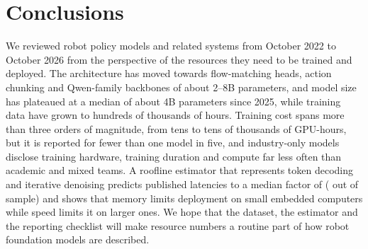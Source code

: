 \documentclass[applsci,review,submit,pdftex,oneauthor]{Definitions/mdpi}
\begin{document}
\section{Conclusions}\label{sec:conclusions}

We reviewed \nModels{} robot policy models and related systems from October 2022 to October 2026 from the perspective of the resources they need to be trained and deployed. The architecture has moved towards flow-matching heads, action chunking and Qwen-family backbones of about 2--8B parameters, and model size has plateaued at a median of about 4B parameters since 2025, while training data have grown to hundreds of thousands of hours. Training cost spans more than three orders of magnitude, from tens to tens of thousands of GPU-hours, but it is reported for fewer than one model in five, and industry-only models disclose training hardware, training duration and compute far less often than academic and mixed teams. A roofline estimator that represents token decoding and iterative denoising predicts published latencies to a median factor of \calMed{} (\looMed{} out of sample) and shows that memory limits deployment on small embedded computers while speed limits it on larger ones. We hope that the dataset, the estimator and the reporting checklist will make resource numbers a routine part of how robot foundation models are described.

\vspace{6pt}





\end{document}
